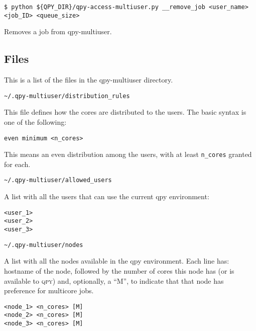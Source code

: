 \documentclass[a4paper,12pt]{article}
\newcommand{\qpy}{\textsc{qpy}}
\begin{document}
\begin{lstlisting}[style=BashStyle]
$ python ${QPY_DIR}/qpy-access-multiuser.py __remove_job <user_name> <job_ID> <queue_size>
\end{lstlisting}

Removes a job from qpy-multiuser.



\subsection{Files}\label{sec:files_admin}

This is a list of the files in the qpy-multiuser directory.

\begin{verbatim}
~/.qpy-multiuser/distribution_rules
\end{verbatim}

This file defines how the cores are distributed to the users.
The basic syntax is one of the following:

\begin{lstlisting}[style=FileStyle]
even minimum <n_cores>
\end{lstlisting}

This means an even distribution among the users, with at least \texttt{n\_cores} granted for each.

\begin{verbatim}
~/.qpy-multiuser/allowed_users
\end{verbatim}

A list with all the users that can use the current qpy environment:

\begin{lstlisting}[style=FileStyle]
<user_1>
<user_2>
<user_3>
\end{lstlisting}

\begin{verbatim}
~/.qpy-multiuser/nodes
\end{verbatim}

A list with all the nodes available in the qpy environment.
Each line has: hostname of the node, followed by the number of cores this node has (or is available to \qpy{}) and, optionally, a ``M'', to indicate that that node has preference for multicore jobs.

\begin{lstlisting}[style=FileStyle]
<node_1> <n_cores> [M]
<node_2> <n_cores> [M]
<node_3> <n_cores> [M]
\end{lstlisting}
\end{document}
